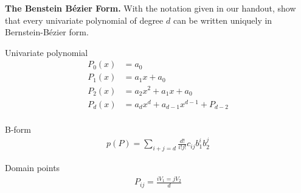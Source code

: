 \textbf{The Benstein B\'ezier Form.} With the notation given in our
handout, show that every univariate polynomial of degree $d$ can be
written uniquely in Bernstein-B\'ezier form.

{\color{blue}

Univariate polynomial
\[
\begin{aligned}
P_0 (x) &= a_0 \\
P_1 (x) &= a_1 x + a_0 \\
P_2 (x) &= a_2 x^2 + a_1 x + a_0 \\
P_d (x) &= a_d x^d + a_{d-1} x^{d-1} + P_{d-2} \\
\end{aligned}
\]


B-form
\[
\begin{aligned}
p(P) = \sum_{i+j=d} \frac{d!}{i!j!} c_{ij} b_1^i b_2^j
\end{aligned}
\]

Domain points
\[
\begin{aligned}
P_{ij} = \frac{i V_1 = j V_2}{d}
\end{aligned}
\]

}
